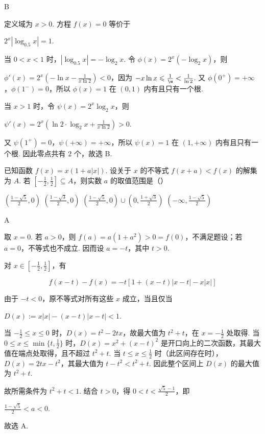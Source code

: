 \begin{answer}
B
\end{answer}

\begin{solution}
定义域为 \(x>0\). 方程 \(f(x)=0\) 等价于

\(2^x|\log_{0.5}x|=1\).

当 \(0<x<1\) 时，\(|\log_{0.5}x|=-\log_{2}x\). 令 \(\phi(x)=2^x(-\log_2x)\)，则

\(\phi'(x)=2^x\left(-\ln x-\frac{1}{x\ln 2}\right)<0\)，因为 \(-x\ln x\leqslant\frac{1}{\e}<\frac{1}{\ln 2}\). 又 \(\phi(0^+)=+\infty\)，\(\phi(1^-)=0\)，所以 \(\phi(x)=1\) 在 \((0,1)\) 内有且只有一个根.

当 \(x>1\) 时，令 \(\psi(x)=2^x\log_2x\)，则

\(\psi'(x)=2^x\left(\ln2\cdot\log_2x+\frac{1}{x\ln2}\right)>0\).

又 \(\psi(1^+)=0\)，\(\psi(+\infty)=+\infty\)，所以 \(\psi(x)=1\) 在 \((1,+\infty)\) 内有且只有一个根. 因此零点共有 \(2\) 个，故选 B.
\end{solution}

\begin{problem}
已知函数 \( f(x) = x(1 + a|x|) \). 设关于 \( x \) 的不等式 \( f(x + a) < f(x) \) 的解集为 \(A\). 若 \( \left[-\frac{1}{2}, \frac{1}{2}\right] \subseteq A \)，则实数 \( a \) 的取值范围是（\quad）

\choices
    {\(\left(\frac{1 - \sqrt{5}}{2}, 0\right)\)}
    {\(\left(\frac{1 - \sqrt{3}}{2}, 0\right)\)}
    {\(\left(\frac{1 - \sqrt{5}}{2}, 0\right) \cup \left(0, \frac{1 + \sqrt{3}}{2}\right)\)}
    {\(\left(-\infty, \frac{1 - \sqrt{5}}{2}\right)\)}
\end{problem}

\begin{answer}
A
\end{answer}

\begin{solution}
取 \(x=0\). 若 \(a>0\)，则 \(f(a)=a(1+a^2)>0=f(0)\)，不满足题设；若 \(a=0\)，不等式也不成立. 因而设 \(a=-t\)，其中 \(t>0\).

对 \(x\in\left[-\frac{1}{2},\frac{1}{2}\right]\)，有

\[
f(x-t)-f(x)=-t\left[1+(x-t)|x-t|-x|x|\right]
\]

由于 \(-t<0\)，原不等式对所有这些 \(x\) 成立，当且仅当

\(D(x):=x|x|-(x-t)|x-t|<1\).

当 \(-\frac{1}{2}\leqslant x\leqslant0\) 时，\(D(x)=t^2-2tx\)，故最大值为 \(t^2+t\)，在 \(x=-\frac{1}{2}\) 处取得. 当 \(0\leqslant x\leqslant\min\{t,\frac{1}{2}\}\) 时，\(D(x)=x^2+(x-t)^2\) 是开口向上的二次函数，其最大值在端点处取得，且不超过 \(t^2+t\). 当 \(t\leqslant x\leqslant\frac{1}{2}\) 时（此区间存在时），\(D(x)=2tx-t^2\)，其最大值为 \(t-t^2<t^2+t\). 因此整个区间上 \(D(x)\) 的最大值为 \(t^2+t\).

故所需条件为 \(t^2+t<1\). 结合 \(t>0\)，得 \(0<t<\frac{\sqrt{5}-1}{2}\)，即

\(\frac{1-\sqrt{5}}{2}<a<0\).

故选 A.
\end{solution}


